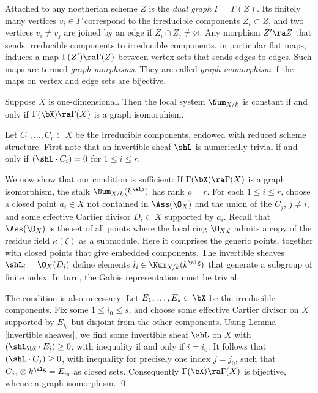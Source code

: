 Attached to any noetherian scheme $Z$ is the \emph{dual graph} $\Gamma=\Gamma(Z)$. Its
finitely many vertices $v_i\in\Gamma$ correspond to the irreducible components $Z_i\subset Z$, and two vertices $v_i\neq v_j$ are joined by an edge if $Z_i\cap Z_j\neq\varnothing$. Any morphism $Z'\ra Z$ that sends irreducible components to irreducible components,
in particular flat maps,  induces a map $\Gamma(Z')\ra\Gamma(Z)$ between vertex sets that sends edges to edges.
Such maps are termed \emph{graph morphisms}. They are called  \emph{graph isomorphism}
if the maps on vertex and edge sets are bijective.

\begin{proposition}
\notready
\label{graph isomorphism}
Suppose   $X$ is one-dimensional. Then the local system  $\Num_{X/k}$ is constant if and only if
 $\Gamma(\bX)\ra\Gamma(X)$ is a graph isomorphism.
\end{proposition}

\proof
Let $C_1,\ldots,C_r\subset X$ be the irreducible components, endowed with reduced scheme structure.
First note that an  invertible sheaf $\shL$ is numerically trivial if and only if $(\shL\cdot C_i)=0$ for $1\leq i\leq r$.

We now show that our condition is sufficient: If $\Gamma(\bX)\ra\Gamma(X)$ is a graph isomorphism,
the stalk $\Num_{X/k}(k^\alg)$ has rank $\rho=r$.
For each $1\leq i\leq r$, choose a closed point $a_i\in X$ not contained in $\Ass(\O_X)$
and the union of the $C_j$, $j\neq i$, and some effective Cartier divisor $D_i\subset X$ supported by $a_i$.
Recall that $\Ass(\O_X)$ is the set of all points where the local ring $\O_{X,\zeta}$ admits a copy of the
residue field $\kappa(\zeta)$ as a submodule. Here it  comprises the generic points, together with closed points that give
embedded components.
The   invertible sheaves $\shL_i=\O_X(D_i)$ define elements $l_i\in\Num_{X/k}(k^\alg)$ that
generate a subgroup of finite index. In turn, the Galois representation must be trivial.

The condition is also necessary: Let $E_1,\ldots,E_s\subset\bX$ be the irreducible components.
Fix some $1\leq i_0\leq s$, and choose some effective
Cartier divisor  on $X$ supported by $E_{i_0}$ but disjoint from the other components.
Using  Lemma \ref{invertible sheaves}, we find  some invertible sheaf $\shL$ on $X$ with $(\shL_\bX\cdot E_i)\geq 0$,
with inequality if and only if $i=i_0$.
It follows that $(\shL\cdot  C_j)\geq 0$, with inequality for precisely one index $j=j_0$,
such that $C_{j_0}\otimes k^\alg=E_{i_0}$ as closed sets.
Consequently $\Gamma(\bX)\ra\Gamma(X)$ is bijective, whence a graph isomorphism.
\qed


